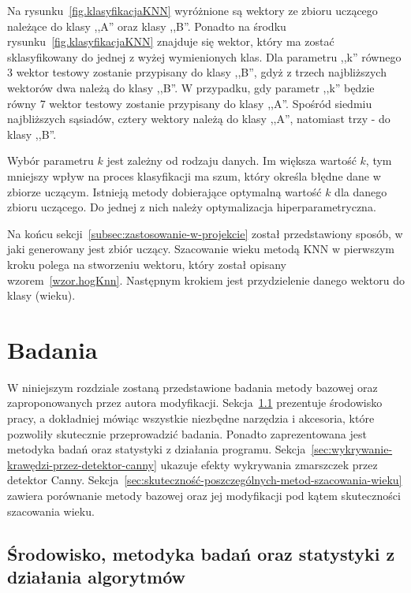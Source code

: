 \documentclass[a4paper,twoside,12pt]{book}
\begin{document}
    Na rysunku~\ref{fig.klasyfikacjaKNN} wyróżnione są wektory ze zbioru uczącego należące do klasy ,,A'' oraz klasy
    ,,B''. Ponadto na środku rysunku~\ref{fig.klasyfikacjaKNN} znajduje się wektor, który ma zostać
    sklasyfikowany do jednej z wyżej wymienionych klas.
    Dla parametru ,,k'' równego 3 wektor testowy zostanie przypisany do klasy ,,B'', gdyż z trzech najbliższych wektorów dwa
    należą do klasy ,,B''. W przypadku, gdy parametr ,,k'' będzie równy 7 wektor testowy zostanie przypisany do klasy
    ,,A''. Spośród siedmiu najbliższych sąsiadów, cztery wektory należą do klasy ,,A'', natomiast trzy - do klasy ,,B''.

    Wybór parametru $k$ jest zależny od rodzaju danych. Im większa wartość $k$, tym mniejszy wpływ na proces
    klasyfikacji ma szum, który określa błędne dane w zbiorze uczącym. Istnieją metody dobierające optymalną wartość $k$ dla
    danego zbioru uczącego. Do jednej z nich należy optymalizacja hiperparametryczna.

    Na końcu sekcji~\ref{subsec:zastosowanie-w-projekcie} został przedstawiony sposób, w jaki generowany jest zbiór
    uczący.
    Szacowanie wieku metodą KNN w pierwszym kroku polega na stworzeniu wektoru, który został opisany
    wzorem~\ref{wzor.hogKnn}.
    Następnym krokiem jest przydzielenie danego wektoru do klasy (wieku).

    \chapter{Badania}\label{ch:badania}
    W niniejszym rozdziale zostaną przedstawione badania metody bazowej oraz zaproponowanych przez autora
    modyfikacji.
    Sekcja~\ref{sec:środowisko-pracy} prezentuje środowisko pracy, a dokładniej mówiąc wszystkie
    niezbędne narzędzia i akcesoria, które pozwoliły skutecznie przeprowadzić badania. Ponadto zaprezentowana jest
    metodyka badań oraz statystyki z działania programu.
    Sekcja~\ref{sec:wykrywanie-krawędzi-przez-detektor-canny} ukazuje efekty wykrywania zmarszczek przez detektor
    Canny.
    Sekcja~\ref{sec:skuteczność-poszczególnych-metod-szacowania-wieku} zawiera porównanie metody bazowej oraz jej
    modyfikacji
    pod kątem skuteczności szacowania wieku.

    \section{Środowisko, metodyka badań oraz statystyki z działania algorytmów}\label{sec:środowisko-pracy}
\end{document}
